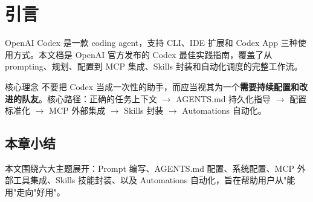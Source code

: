 \section{引言}

OpenAI Codex 是一款 coding agent，支持 CLI、IDE 扩展和 Codex App 三种使用方式。本文档是 OpenAI 官方发布的 Codex 最佳实践指南，覆盖了从 prompting、规划、配置到 MCP 集成、Skills 封装和自动化调度的完整工作流。

\begin{importantbox}{核心理念}
不要把 Codex 当成一次性的助手，而应当视其为一个\textbf{需要持续配置和改进的队友}。核心路径：正确的任务上下文 $\rightarrow$ AGENTS.md 持久化指导 $\rightarrow$ 配置标准化 $\rightarrow$ MCP 外部集成 $\rightarrow$ Skills 封装 $\rightarrow$ Automations 自动化。
\end{importantbox}

\subsection{本章小结}

本文围绕六大主题展开：Prompt 编写、AGENTS.md 配置、系统配置、MCP 外部工具集成、Skills 技能封装、以及 Automations 自动化，旨在帮助用户从"能用"走向"好用"。


